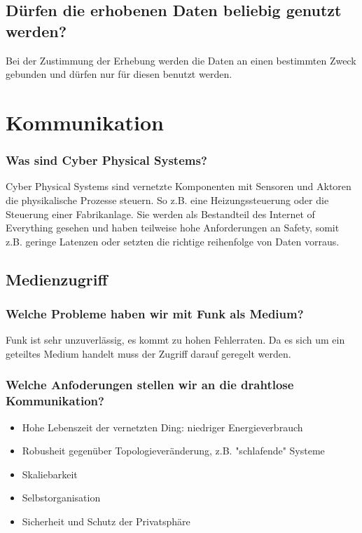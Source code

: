 	\subsection{Dürfen die erhobenen Daten beliebig genutzt werden?}
	Bei der Zustimmung der Erhebung werden die Daten an einen bestimmten Zweck gebunden und dürfen nur für diesen benutzt werden.
	
\section{Kommunikation}

	\subsubsection{Was sind Cyber Physical Systems?}
	Cyber Physical Systems sind vernetzte Komponenten mit Sensoren und Aktoren die physikalische Prozesse steuern. So z.B. eine Heizungssteuerung oder die Steuerung einer Fabrikanlage.
	Sie werden als Bestandteil des Internet of Everything gesehen und haben teilweise hohe Anforderungen an Safety, somit z.B. geringe Latenzen oder setzten die richtige reihenfolge von Daten vorraus.
	
	\subsection{Medienzugriff}

	\subsubsection{Welche Probleme haben wir mit Funk als Medium?}
	Funk ist sehr unzuverlässig, es kommt zu hohen Fehlerraten. Da es sich um ein geteiltes Medium handelt muss der Zugriff darauf geregelt werden.
	
	\subsubsection{Welche Anfoderungen stellen wir an die drahtlose Kommunikation?}
	\begin{itemize}
		\item Hohe Lebenszeit der vernetzten Ding: niedriger Energieverbrauch
		\item Robusheit gegenüber Topologieveränderung, z.B. "schlafende" Systeme
		\item Skaliebarkeit
		\item Selbstorganisation
		\item Sicherheit und Schutz der Privatsphäre
\end{itemize}


